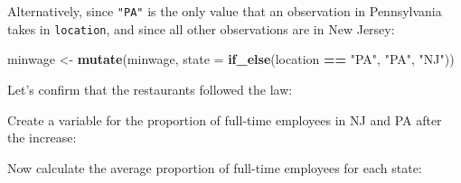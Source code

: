 \documentclass[]{book}
\newenvironment{Shaded}{\begin{snugshade}}{\end{snugshade}}
\newcommand{\CommentTok}[1]{\textcolor[rgb]{0.56,0.35,0.01}{\textit{#1}}}
\newcommand{\DataTypeTok}[1]{\textcolor[rgb]{0.13,0.29,0.53}{#1}}
\newcommand{\KeywordTok}[1]{\textcolor[rgb]{0.13,0.29,0.53}{\textbf{#1}}}
\newcommand{\NormalTok}[1]{#1}
\newcommand{\OperatorTok}[1]{\textcolor[rgb]{0.81,0.36,0.00}{\textbf{#1}}}
\newcommand{\StringTok}[1]{\textcolor[rgb]{0.31,0.60,0.02}{#1}}
\theoremstyle{definition}
\theoremstyle{definition}
\theoremstyle{definition}
\theoremstyle{remark}
\begin{document}
Alternatively, since \texttt{"PA"} is the only value that an observation
in Pennsylvania takes in \texttt{location}, and since all other
observations are in New Jersey:

\begin{Shaded}
\begin{Highlighting}[]
\NormalTok{minwage <-}
\StringTok{  }\KeywordTok{mutate}\NormalTok{(minwage, }\DataTypeTok{state =} \KeywordTok{if_else}\NormalTok{(location }\OperatorTok{==}\StringTok{ "PA"}\NormalTok{, }\StringTok{"PA"}\NormalTok{, }\StringTok{"NJ"}\NormalTok{))}
\end{Highlighting}
\end{Shaded}

Let's confirm that the restaurants followed the law:

\begin{Shaded}
\end{Shaded}

Create a variable for the proportion of full-time employees in NJ and PA
after the increase:

\begin{Shaded}
\end{Shaded}

Now calculate the average proportion of full-time employees for each
state:
\end{document}
